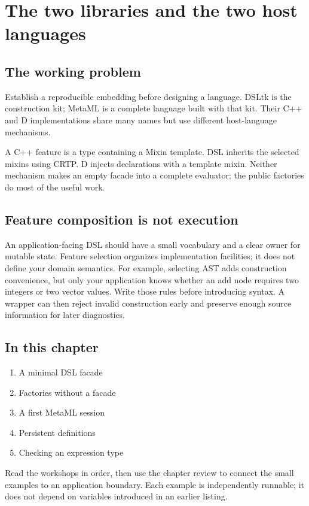 \chapter{The two libraries and the two host languages}\label{ch:1}
\section*{The working problem}
Establish a reproducible embedding before designing a language. DSLtk is the construction kit; MetaML is a complete language built with that kit. Their C++ and D implementations share many names but use different host-language mechanisms.

A C++ feature is a type containing a Mixin template. DSL inherits the selected mixins using CRTP. D injects declarations with a template mixin. Neither mechanism makes an empty facade into a complete evaluator; the public factories do most of the useful work.

\section*{Feature composition is not execution}
An application-facing DSL should have a small vocabulary and a clear owner for mutable state. Feature selection organizes implementation facilities; it does not define your domain semantics. For example, selecting AST adds construction convenience, but only your application knows whether an add node requires two integers or two vector values. Write those rules before introducing syntax. A wrapper can then reject invalid construction early and preserve enough source information for later diagnostics.

\section*{In this chapter}
\begin{enumerate}
\item A minimal DSL facade
\item Factories without a facade
\item A first MetaML session
\item Persistent definitions
\item Checking an expression type
\end{enumerate}
Read the workshops in order, then use the chapter review to connect the small examples to an application boundary. Each example is independently runnable; it does not depend on variables introduced in an earlier listing.

